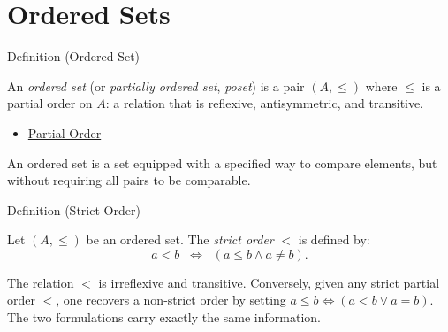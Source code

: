 
\section{Ordered Sets}\label{sec:ordered-sets}


\begin{definitionbox}{Definition (Ordered Set)}
\begin{definition}\label{def:ordered-set}
An \emph{ordered set} (or \emph{partially ordered set}, \emph{poset}) is a
pair $(A,\leq)$ where $\leq$ is a partial order on $A$: a relation that is
reflexive, antisymmetric, and transitive.
\end{definition}
\end{definitionbox}

\begin{dependencies}
\begin{itemize}
  \item \hyperref[def:partial-order]{Partial Order}
\end{itemize}
\end{dependencies}

\begin{remark*}
An ordered set is a set equipped with a specified way to compare elements,
but without requiring all pairs to be comparable.
\end{remark*}

\begin{definitionbox}{Definition (Strict Order)}
\begin{definition}\label{def:strict-order}
Let $(A,\leq)$ be an ordered set. The \emph{strict order} $<$ is defined by:
\[
a < b \;\;\Longleftrightarrow\;\; (a \leq b \land a \neq b).
\]
\end{definition}
\end{definitionbox}

\begin{remark*}
The relation $<$ is irreflexive and transitive. Conversely, given any strict
partial order $<$, one recovers a non-strict order by setting
$a \leq b \iff (a < b \lor a=b)$. The two formulations carry exactly the
same information.
\end{remark*}

